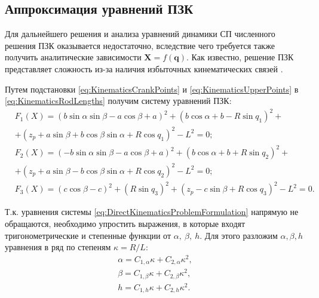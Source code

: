 \subsection{Аппроксимация уравнений ПЗК}

Для дальнейшего решения и анализа уравнений динамики СП численного решения ПЗК оказывается недостаточно, вследствие чего требуется также получить аналитические зависимости $\mathbf{X}=f\left(\mathbf{q}\right)$.
Как известно, решение ПЗК представляет сложность из-за наличия избыточных кинематических связей \cite{2014c,Bonev2000,Niu2013,Lapikov2014,2007,Charters2009,Kucuk2006,Hu2011,Jiang2008}.

Путем подстановки \ref{eq:KinematicsCrankPoints} и \ref{eq:KinematicsUpperPoints} в \ref{eq:KinematicsRodLengths} получим систему уравнений ПЗК:
\begin{equation}
\label{eq:DirectKinematicsProblemFormulation}
\begin{aligned}
& F_1\left(X\right)=\left(b\sin{\alpha}\sin{\beta}-a\cos{\beta}+a\right)^2+\left(b\cos{\alpha}+b-R\sin{q_1}\right)^2+\\
&+\left(z_p+a\sin{\beta}+b\cos{\beta}\sin{\alpha}+R\cos{q_1}\right)^2-L^2=0;\\
& F_2\left(X\right)=\left(-b\sin{\alpha}\sin{\beta}-a\cos{\beta}+a\right)^2+\left(b\cos{\alpha}+b+R\sin{q_2}\right)^2+\\
&+\left(z_p+a\sin{\beta}-b\cos{\beta}\sin{\alpha}+R\cos{q_2}\right)^2-L^2=0;\\
& F_3\left(X\right)=\left(c\cos{\beta}-c\right)^2+\left(R\sin{q_3}\right)^2+\left(z_p-c\sin{\beta}+R\cos{q_3}\right)^2-L^2=0.
\end{aligned}
\end{equation}

Т.к. уравнения системы \ref{eq:DirectKinematicsProblemFormulation} напрямую не обращаются, необходимо упростить выражения, в которые входят тригонометрические и степенные функции от $\alpha,~\beta,~h$. Для этого разложим $\alpha, \beta, h$ уравнения  в ряд по степеням $\kappa = R/L$:
\begin{equation}
\label{eq:DirectKinematicsSeriesExpansion}
\begin{aligned}
	\alpha = C_{1,\alpha}\kappa + C_{2,\alpha}\kappa^2, \\
	\beta = C_{1,\beta}\kappa + C_{2,\beta}\kappa^2, \\
	h = C_{1,h}\kappa + C_{2,h}\kappa^2.
\end{aligned}
\end{equation}

